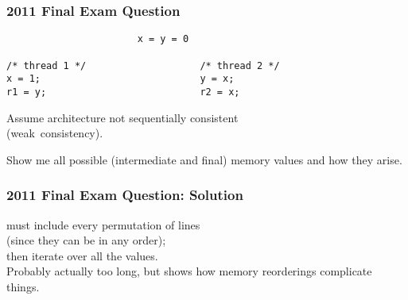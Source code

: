 \documentclass[aspectratio=43]{beamer}
\newenvironment{changemargin}[1]{%
  \begin{list}{}{%
    \setlength{\topsep}{0pt}%
    \setlength{\leftmargin}{#1}%
    \setlength{\rightmargin}{1em}
    \setlength{\listparindent}{\parindent}%
    \setlength{\itemindent}{\parindent}%
    \setlength{\parsep}{\parskip}%
  }%
  \item[]}{\end{list}}
\begin{document}
\begin{frame}[fragile]
  \frametitle{2011 Final Exam Question}

  \begin{changemargin}{1.5cm}
  \begin{lstlisting}
                       x = y = 0

/* thread 1 */                    /* thread 2 */
x = 1;                            y = x;
r1 = y;                           r2 = x;
  \end{lstlisting}

  Assume architecture not sequentially consistent\\ \hspace*{3em} (weak~consistency).

  Show me all possible (intermediate and final) memory values and how they arise.
  \end{changemargin}
\end{frame}

\begin{frame}[fragile]
  \frametitle{2011 Final Exam Question: Solution}

  \begin{changemargin}{1.5cm}
    must include every permutation of lines \\ \qquad (since they can be in
      any order);\\
    then iterate over all the values.\\[1em]

    Probably actually too long, but shows how memory reorderings
      complicate things.
  \end{changemargin}
\end{frame}
\end{document}
